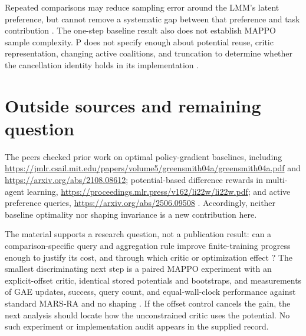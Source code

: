 \documentclass{article}
\begin{document}
Repeated comparisons may reduce sampling error around the LMM's latent preference, but cannot remove a systematic gap between that preference and task contribution . The one-step baseline result also does not establish MAPPO sample complexity. P does not specify enough about potential reuse, critic representation, changing active coalitions, and truncation to determine whether the cancellation identity holds in its implementation .

\section*{Outside sources and remaining question}
The peers checked prior work on optimal policy-gradient baselines, including \url{https://jmlr.csail.mit.edu/papers/volume5/greensmith04a/greensmith04a.pdf} and \url{https://arxiv.org/abs/2108.08612}; potential-based difference rewards in multi-agent learning, \url{https://proceedings.mlr.press/v162/li22w/li22w.pdf}; and active preference queries, \url{https://arxiv.org/abs/2506.09508} . Accordingly, neither baseline optimality nor shaping invariance is a new contribution here.

The material supports a research question, not a publication result: can a comparison-specific query and aggregation rule improve finite-training progress enough to justify its cost, and through which critic or optimization effect ? The smallest discriminating next step is a paired MAPPO experiment with an explicit-offset critic, identical stored potentials and bootstraps, and measurements of GAE updates, success, query count, and equal-wall-clock performance against standard MARS-RA and no shaping . If the offset control cancels the gain, the next analysis should locate how the unconstrained critic uses the potential. No such experiment or implementation audit appears in the supplied record.
\end{document}
